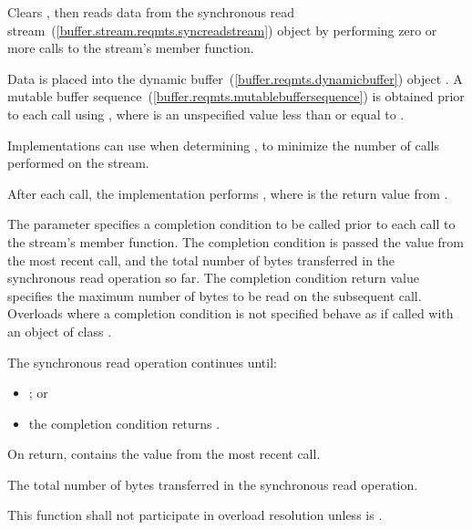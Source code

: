 \begin{itemdescr}
\pnum
\effects Clears , then reads data from the synchronous read stream~(\ref{buffer.stream.reqmts.syncreadstream}) object  by performing zero or more calls to the stream's  member function.

\pnum
Data is placed into the dynamic buffer~(\ref{buffer.reqmts.dynamicbuffer}) object . A mutable buffer sequence~(\ref{buffer.reqmts.mutablebuffersequence}) is obtained prior to each  call using , where  is an unspecified value less than or equal to . \begin{note} Implementations can use  when determining , to minimize the number of  calls performed on the stream. \end{note} After each  call, the implementation performs , where  is the return value from .

\pnum
The  parameter specifies a completion condition to be called prior to each call to the stream's  member function. The completion condition is passed the  value from the most recent  call, and the total number of bytes transferred in the synchronous read operation so far. The completion condition return value specifies the maximum number of bytes to be read on the subsequent  call. Overloads where a completion condition is not specified behave as if called with an object of class .

\pnum
 The synchronous read operation continues until:

\begin{itemize}
\item {}; or
\item the completion condition returns .
\end{itemize}

\pnum
On return,  contains the  value from the most recent  call.

\pnum
\returns The total number of bytes transferred in the synchronous read operation.

\pnum
\remarks This function shall not participate in overload resolution unless  is .
\end{itemdescr}



